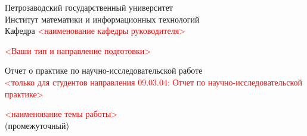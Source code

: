 \documentclass[a4paper,12pt]{article}
\renewcommand{\baselinestretch}{1.50}
\begin{document}

\thispagestyle{empty}
\begin{center}


\renewcommand{\baselinestretch}{1}
{\large
{\sc Петрозаводский государственный университет\\
Институт математики и информационных технологий\\
	Кафедра \textcolor{red}{<наименование кафедры руководителя>}
}
}

\end{center}


\begin{center}
%
%
%
% 
	\textcolor{red}{<Ваши тип и направление подготовки>} 
\end{center}

\vfill

\begin{center}
{\normalsize Отчет о практике по научно-исследовательской работе} \\
	\textcolor{red}{<только для студентов направления 09.03.04:
	Отчет по научно-исследовательской практике>}

\medskip

	{\Large \sc \textcolor{red}{<наименование темы работы>}} \\
	(промежуточный)
\end{center}

\medskip
\end{document}
